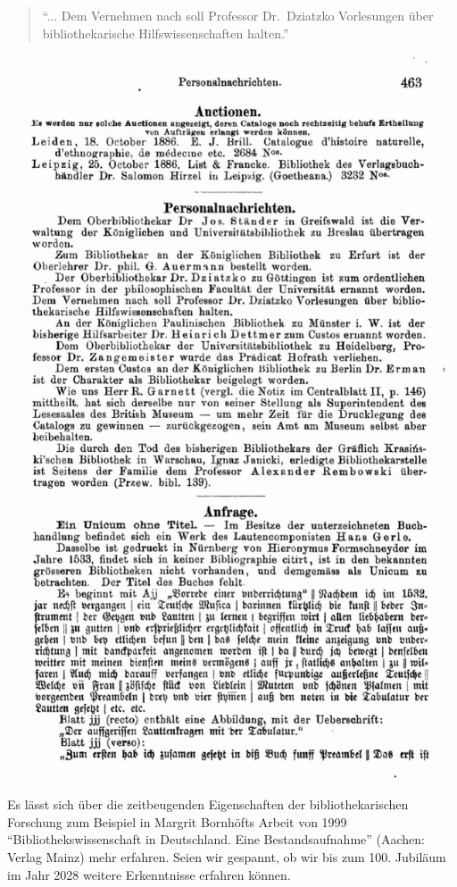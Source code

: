 \documentclass[a4paper,
fontsize=11pt,
oneside,
numbers=noperiodatend,
parskip=half-,
bibliography=totoc,
final
]{scrartcl}
\begin{document}
\begin{quote}
\enquote{... Dem Vernehmen nach soll Professor Dr.~Dziatzko
Vorlesungen über bibliothekarische Hilfswissenschaften halten.}
\end{quote}

\begin{center}
\includegraphics{img/image5.jpg}
\end{center}

Es lässt sich über die zeitbeugenden Eigenschaften der
bibliothekarischen Forschung zum Beispiel in Margrit Bornhöfts Arbeit
von 1999 \enquote{Bibliothekswissenschaft in Deutschland. Eine
Bestandsaufnahme} (Aachen: Verlag Mainz) mehr erfahren. Seien wir
gespannt, ob wir bis zum 100. Jubiläum im Jahr 2028 weitere Erkenntnisse
erfahren können.
\end{document}
